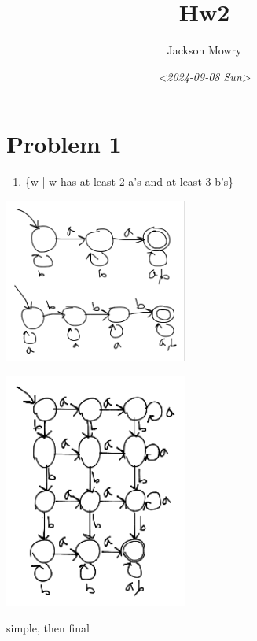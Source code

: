 \documentclass[letterpaper, 12pt]{article}
\author{Jackson Mowry}
\date{\textit{<2024-09-08 Sun>}}
\title{Hw2}
\begin{document}
\maketitle
\tableofcontents

\section{Problem 1}
\label{sec:org69175a3}
\begin{enumerate}
\item \{w | w has at least 2 a's and at least 3 b's\}
\end{enumerate}
\begin{center}
\includegraphics[width=6cm]{hw2/simple1-1.png}
\end{center}
\begin{center}
\includegraphics[width=6cm]{hw2/1-1.png}
\end{center}
simple, then final
\end{document}
